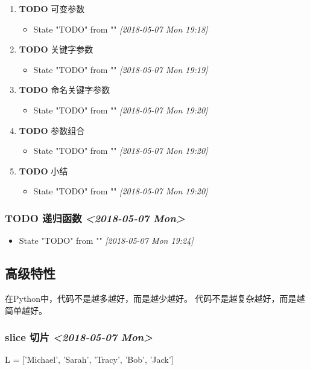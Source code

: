 \documentclass[11pt]{article}
\begin{document}
\begin{enumerate}
\item {\bfseries\sffamily TODO} 可变参数
\label{sec:orga7c69ed}
\begin{itemize}
\item State "TODO"       from ""           \textit{[2018-05-07 Mon 19:18]}
\end{itemize}
\item {\bfseries\sffamily TODO} 关键字参数
\label{sec:orgd8c2c9b}
\begin{itemize}
\item State "TODO"       from ""           \textit{[2018-05-07 Mon 19:19]}
\end{itemize}
\item {\bfseries\sffamily TODO} 命名关键字参数
\label{sec:orgcf8c1b0}
\begin{itemize}
\item State "TODO"       from ""           \textit{[2018-05-07 Mon 19:20]}
\end{itemize}
\item {\bfseries\sffamily TODO} 参数组合
\label{sec:org015fc41}
\begin{itemize}
\item State "TODO"       from ""           \textit{[2018-05-07 Mon 19:20]}
\end{itemize}
\item {\bfseries\sffamily TODO} 小结
\label{sec:org64fc24a}
\begin{itemize}
\item State "TODO"       from ""           \textit{[2018-05-07 Mon 19:20]}
\end{itemize}
\end{enumerate}
\subsubsection{{\bfseries\sffamily TODO} 递归函数 \textit{<2018-05-07 Mon>}}
\label{sec:org0428bb8}
\begin{itemize}
\item State "TODO"       from ""           \textit{[2018-05-07 Mon 19:24]}
\end{itemize}
\subsection{高级特性}
\label{sec:orge3361b9}
在Python中，代码不是越多越好，而是越少越好。
代码不是越复杂越好，而是越简单越好。
\subsubsection{slice 切片 \textit{<2018-05-07 Mon>}}
\label{sec:orgd070269}
L = ['Michael', 'Sarah', 'Tracy', 'Bob', 'Jack']
\end{document}
